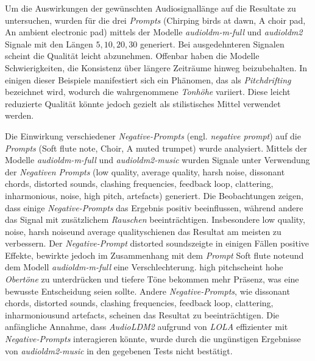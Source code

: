 \documentclass[
  a4paper,  %
  twoside,  %
  bibliography=totoc,
  headsepline,
  cleardoublepage=empty,
  parskip=half,
  draft=false
]{scrbook}
\begin{document}
Um die Auswirkungen der gewünschten Audiosignallänge auf die Resultate zu untersuchen, wurden für die drei \emph{Prompts} (\glqq Chirping birds at dawn\grqq, \glqq A choir pad\grqq, \glqq An ambient electronic pad\grqq) mittels der Modelle \emph{audioldm-m-full} \cite{noauthor_cvsspaudioldm-m-full_nodate} und \emph{audioldm2} \cite{noauthor_cvsspaudioldm2_nodate} Signale mit den Längen $5,10,20,30$ generiert. Bei ausgedehnteren Signalen scheint die Qualität leicht abzunehmen. Offenbar haben die Modelle Schwierigkeiten, die Konsistenz über längere Zeiträume hinweg beizubehalten. In einigen dieser Beispiele manifestiert sich ein Phänomen, das als \emph{Pitchdrifting} bezeichnet wird, wodurch die wahrgenommene \emph{Tonhöhe} variiert. Diese leicht reduzierte Qualität könnte jedoch gezielt als stilistisches Mittel verwendet werden.

Die Einwirkung verschiedener \emph{Negative-Prompts} (engl. \emph{negative prompt}) auf die \emph{Prompts} (\glqq Soft flute note\grqq, \glqq Choir\grqq, \glqq A muted trumpet\grqq) wurde analysiert. Mittels der Modelle \emph{audioldm-m-full} \cite{noauthor_cvsspaudioldm-m-full_nodate} und \emph{audioldm2-music} \cite{noauthor_cvsspaudioldm2-music_nodate} wurden Signale unter Verwendung der \emph{Negativen Prompts} (\glqq low quality\grqq, \glqq average quality\grqq, \glqq harsh noise\grqq, \glqq dissonant chords\grqq, \glqq distorted sounds\grqq, \glqq clashing frequencies\grqq, \glqq feedback loop\grqq, \glqq clattering\grqq, \glqq inharmonious\grqq, \glqq noise\grqq, \glqq high pitch\grqq, \glqq artefacts\grqq) generiert. Die Beobachtungen zeigen, dass einige \emph{Negative-Prompts} das Ergebnis positiv beeinflussen, während andere das Signal mit zusätzlichem \emph{Rauschen} beeinträchtigen. Insbesondere \glqq low quality\grqq, \glqq noise\grqq, \glqq harsh noise\grqq und \glqq average quality\grqq schienen das Resultat am meisten zu verbessern. Der \emph{Negative-Prompt} \glqq distorted sounds\grqq zeigte in einigen Fällen positive Effekte, bewirkte jedoch im Zusammenhang mit dem \emph{Prompt} \glqq Soft flute note\grqq und dem Modell \emph{audioldm-m-full} eine Verschlechterung. \glqq high pitch\grqq scheint hohe \emph{Obertöne} zu unterdrücken und tiefere Töne bekommen mehr Präsenz, was eine bewusste Entscheidung seien sollte. Andere \emph{Negative-Prompts}, wie \glqq dissonant chords\grqq, \glqq distorted sounds\grqq, \glqq clashing frequencies\grqq, \glqq feedback loop\grqq, \glqq clattering\grqq, \glqq inharmonious\grqq und \glqq artefacts\grqq, scheinen das Resultat zu beeinträchtigen. Die anfängliche Annahme, dass \emph{AudioLDM2} aufgrund von \emph{LOLA} effizienter mit \emph{Negative-Prompts} interagieren könnte, wurde durch die ungünstigen Ergebnisse von \emph{audioldm2-music} in den gegebenen Tests nicht bestätigt.
\end{document}
